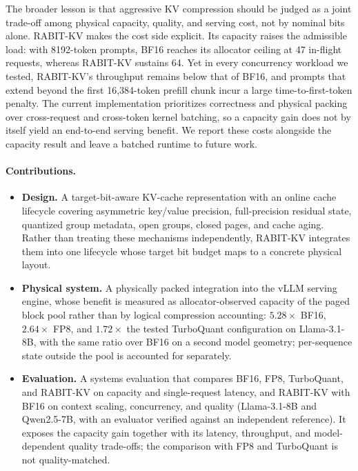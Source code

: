 \documentclass{article}
\begin{document}
The broader lesson is that aggressive KV compression should be judged as a joint trade-off among
physical capacity, quality, and serving cost, not by nominal bits alone. RABIT-KV makes the cost side
explicit. Its capacity raises the admissible load: with 8192-token prompts, BF16 reaches its allocator
ceiling at 47 in-flight requests, whereas RABIT-KV sustains 64. Yet in every concurrency workload we
tested, RABIT-KV's throughput remains below that of BF16, and prompts that extend beyond the first
16,384-token prefill chunk incur a large time-to-first-token penalty. The current implementation
prioritizes correctness and physical packing over cross-request and cross-token kernel batching, so a
capacity gain does not by itself yield an end-to-end serving benefit. We report these costs alongside
the capacity result and leave a batched runtime to future work.

\paragraph{Contributions.}
\vspace{-0.6\baselineskip}
\begin{itemize}
\item \textbf{Design.} A target-bit-aware KV-cache representation with an online cache lifecycle
  covering asymmetric key/value precision, full-precision residual state, quantized group metadata,
  open groups, closed pages, and cache aging. Rather than treating these mechanisms independently,
  RABIT-KV integrates them into one lifecycle whose target bit budget maps to a concrete physical
  layout.
\item \textbf{Physical system.} A physically packed integration into the vLLM serving engine, whose
  benefit is measured as allocator-observed capacity of the paged block pool rather than by logical
  compression accounting: $5.28\times$ BF16, $2.64\times$ FP8, and $1.72\times$ the tested TurboQuant
  configuration on Llama-3.1-8B, with the same ratio over BF16 on a second model geometry; per-sequence
  state outside the pool is accounted for separately.
\item \textbf{Evaluation.} A systems evaluation that compares BF16, FP8, TurboQuant, and RABIT-KV on
  capacity and single-request latency, and RABIT-KV with BF16 on context scaling, concurrency, and
  quality (Llama-3.1-8B and Qwen2.5-7B, with an evaluator verified against an independent reference).
  It exposes the capacity gain together with its latency, throughput, and model-dependent quality
  trade-offs; the comparison with FP8 and TurboQuant is not quality-matched.
\end{itemize}
\end{document}
